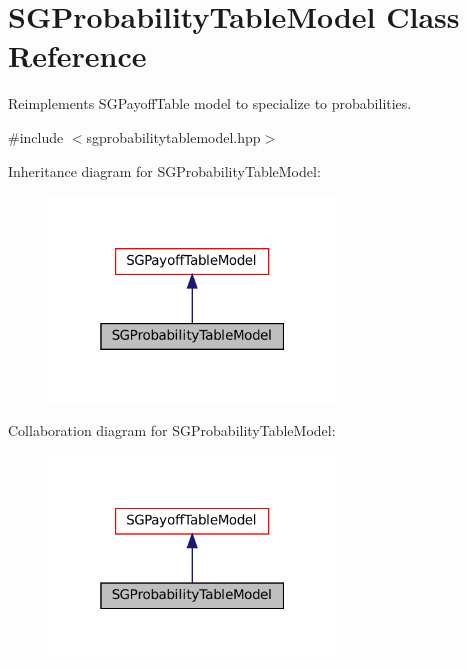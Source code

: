 \hypertarget{classSGProbabilityTableModel}{}\section{S\+G\+Probability\+Table\+Model Class Reference}
\label{classSGProbabilityTableModel}


Reimplements S\+G\+Payoff\+Table model to specialize to probabilities.  




{\ttfamily \#include $<$sgprobabilitytablemodel.\+hpp$>$}



Inheritance diagram for S\+G\+Probability\+Table\+Model\+:
\nopagebreak
\begin{figure}[H]
\begin{center}
\leavevmode
\includegraphics[width=217pt]{classSGProbabilityTableModel__inherit__graph}
\end{center}
\end{figure}


Collaboration diagram for S\+G\+Probability\+Table\+Model\+:
\nopagebreak
\begin{figure}[H]
\begin{center}
\leavevmode
\includegraphics[width=217pt]{classSGProbabilityTableModel__coll__graph}
\end{center}
\end{figure}
